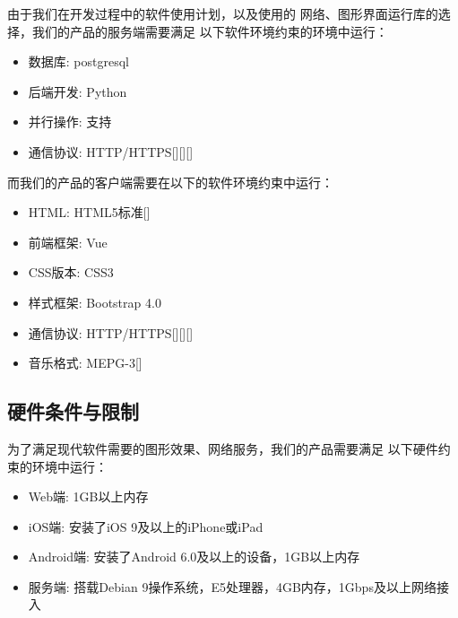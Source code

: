     由于我们在开发过程中的软件使用计划，以及使用的
    网络、图形界面运行库的选择，我们的产品的服务端需要满足
    以下软件环境约束的环境中运行：
    \begin{itemize}
        \item 数据库: postgresql
        \item 后端开发: Python
        \item 并行操作: 支持
        \item 通信协议: HTTP/HTTPS[\cite{berners1996hypertext}][\cite{fielding1999hypertext}][\cite{rescorla2000http}]
    \end{itemize}

    而我们的产品的客户端需要在以下的软件环境约束中运行：
    \begin{itemize}
    \item HTML: HTML5标准[\cite{hickson2011html5}]
    \item 前端框架: Vue
    \item CSS版本: CSS3
    \item 样式框架: Bootstrap 4.0
    \item 通信协议: HTTP/HTTPS[\cite{berners1996hypertext}][\cite{fielding1999hypertext}][\cite{rescorla2000http}]
    \item 音乐格式: MEPG-3[\cite{le1991mpeg}]
\end{itemize}

\subsection{硬件条件与限制} %

        为了满足现代软件需要的图形效果、网络服务，我们的产品需要满足
        以下硬件约束的环境中运行：
        \begin{itemize}
            \item Web端: 1GB以上内存
            \item iOS端: 安装了iOS 9及以上的iPhone或iPad
            \item Android端: 安装了Android 6.0及以上的设备，1GB以上内存
            \item 服务端: 搭载Debian 9操作系统，E5处理器，4GB内存，1Gbps及以上网络接入
        \end{itemize}

